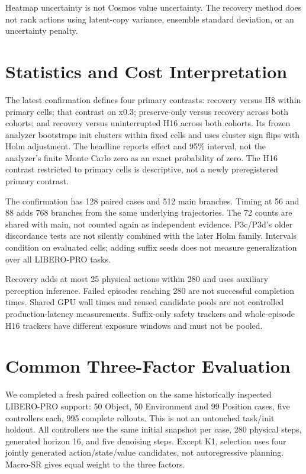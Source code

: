 \documentclass{article}
\begin{document}
\begin{table}[ht]
\caption{Frozen heatmap score-range thresholds and XYZ workspace boxes
in meters. These are feasibility parameters, not success probabilities.}
\centering\scriptsize
\end{table}

Heatmap uncertainty is not Cosmos value uncertainty.
The recovery method does not rank actions using latent-copy variance,
ensemble standard deviation, or an uncertainty penalty.

\section{Statistics and Cost Interpretation}
\label{app:stats}
The latest confirmation defines four primary contrasts: recovery versus H8
within primary cells; that contrast on x0.3; preserve-only versus recovery
across both cohorts; and recovery versus uninterrupted H16 across both cohorts.
Its frozen analyzer bootstraps init clusters within fixed cells and uses
cluster sign flips with Holm adjustment.
The headline reports effect and 95\% interval, not the analyzer's finite
Monte Carlo zero as an exact probability of zero.
The H16 contrast restricted to primary cells is descriptive, not a newly
preregistered primary contrast.

The confirmation has 128 paired cases and 512 main branches.
Timing at 56 and 88 adds 768 branches from the same underlying trajectories.
The 72 counts are shared with main, not counted again as independent evidence.
P3c/P3d's older discordance tests are not silently combined with the later
Holm family. Intervals condition on evaluated cells; adding suffix seeds
does not measure generalization over all LIBERO-PRO tasks.

Recovery adds at most 25 physical actions within 280 and uses auxiliary
perception inference. Failed episodes reaching 280 are not successful
completion times. Shared GPU wall times and reused candidate pools are
not controlled production-latency measurements.
Suffix-only safety trackers and whole-episode H16 trackers have different
exposure windows and must not be pooled.

\section{Common Three-Factor Evaluation}
\label{app:broad}
We completed a fresh paired collection on the same historically inspected
LIBERO-PRO support: 50 Object, 50 Environment and 99 Position cases,
five controllers each, 995 complete rollouts. This is not an untouched
task/init holdout. All controllers use the same initial snapshot per case,
280 physical steps, generated horizon 16, and five denoising steps.
Except K1, selection uses four jointly generated action/state/value candidates,
not autoregressive planning. Macro-SR gives equal weight to the three factors.
\end{document}

